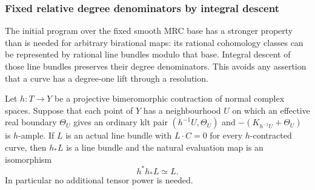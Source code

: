 \subsubsection{Fixed relative degree denominators by integral descent}
\label{repair:subsec:relative-nqc-integral}

The initial program over the fixed smooth MRC base has a stronger
property than is needed for arbitrary birational maps: its rational
cohomology classes can be represented by rational line bundles modulo
that base. Integral descent of those line bundles preserves their
degree denominators. This avoids any assertion that a curve has a
degree-one lift through a resolution.

\begin{lemma}
\label{repair:lem:relative-nqc-integral-descent}
Let $h:T\to Y$ be a projective bimeromorphic contraction of normal
complex spaces. Suppose that each point of $Y$ has a neighbourhood
$U$ on which an effective real boundary $\Theta_U$ gives an ordinary
klt pair $(h^{-1}U,\Theta_U)$ and
$-(K_{h^{-1}U}+\Theta_U)$ is $h$-ample. If $L$ is an actual line
bundle with $L\cdot C=0$ for every $h$-contracted curve, then
$h_*L$ is a line bundle and the natural evaluation map is an
isomorphism
\[
                         h^*h_*L\simeq L.
\]
In particular no additional tensor power is needed.
\end{lemma}

